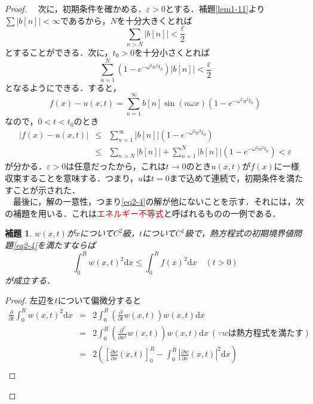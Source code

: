 \documentclass[a4j]{jsbook}
\newtheorem{lemma}[theorem]{補題}
\numberwithin{theorem}{chapter}  %
\begin{document}
\begin{proof}
　次に，初期条件を確かめる．\(\varepsilon>0\)とする．補題\ref{lem1-11}より\(\displaystyle\sum |b[n]|<\infty\)であるから，\(N\)を十分大きくとれば
\begin{equation*}
    \sum_{n>N}|b[n]|<\frac{\varepsilon}{2}
\end{equation*}
とすることができる．次に，\(t_0>0\)を十分小さくとれば
\begin{equation*}
    \sum_{n=1}^N\left(1-e^{-\omega^2 n^2t_0}\right)|b[n]|<\frac{\varepsilon}{2}
\end{equation*}
となるようにできる．すると，
\begin{equation*}
    f(x)-u(x, t)=\sum_{n=1}^\infty b[n]\sin(n\omega x)\left(1-e^{-\omega^2 n^2t_0}\right)
\end{equation*}
なので，\(0<t<t_0\)のとき
\begin{eqnarray*}
|f(x)-u(x, t)|&\leq&\sum_{n=1}^\infty |b[n]|\left(1-e^{-\omega^2 n^2t_0}\right) \\
&\leq&\sum_{n>N}|b[n]|+\sum_{n=1}^N |b[n]|\left(1-e^{-\omega^2 n^2t_0}\right)<\varepsilon
\end{eqnarray*}
が分かる．\(\varepsilon>0\)は任意だったから，これは\(t\to 0\)のとき\(u(x, t)\)が\(f(x)\)に一様収束することを意味する．つまり，\(u\)は\(t=0\)まで込めて連続で，初期条件を満たすことが示された．\\
　最後に，解の一意性，つまり\eqref{eq2-4}の解が他にないことを示す．それには，次の補題を用いる．これは\textcolor{red}{エネルギー不等式}と呼ばれるものの一例である．
\begin{lemma}
\label{lem2-7}
\(w(x, t)\)が\(x\)について\(C^2\)級，\(t\)について\(C^1\)級で，熱方程式の初期境界値問題\eqref{eq2-4}を満たすならば
\begin{equation}
    \int_0^R w(x, t)^2\mathrm{d}x\leq\int_0^R f(x)^2\mathrm{d}x\quad (t>0) \label{eq2-8}
\end{equation}
が成立する．
\end{lemma}
\begin{proof}
左辺を\(t\)について偏微分すると
\begin{eqnarray*}
\frac{\partial}{\partial t}\int_0^R w(x, t)^2\mathrm{d}x&=&2\int_0^R\left(\frac{\partial}{\partial t}w(x, t)\right)w(x, t)\mathrm{d}x \\
&=&2\int_0^R\left(\frac{\partial^2}{\partial x^2}w(x, t)\right)w(x, t)\mathrm{d}x\ (\because w\mbox{は熱方程式を満たす}) \\
&=&2\left(\left[\frac{\partial w}{\partial x}(x, t)\right]_0^R-\int_0^R\left|\frac{\partial w}{\partial x}(x, t)\right|^2\mathrm{d}x\right) \\

\end{eqnarray*}
\end{proof}
\end{proof}
\end{document}
